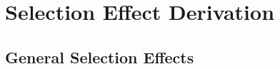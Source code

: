 \documentclass[a4paper,fleqn,usenatbib]{mnras}
\begin{document}









\appendix

\section{Selection Effect Derivation}
\label{app:selection}

\subsection{General Selection Effects}
\end{document}
